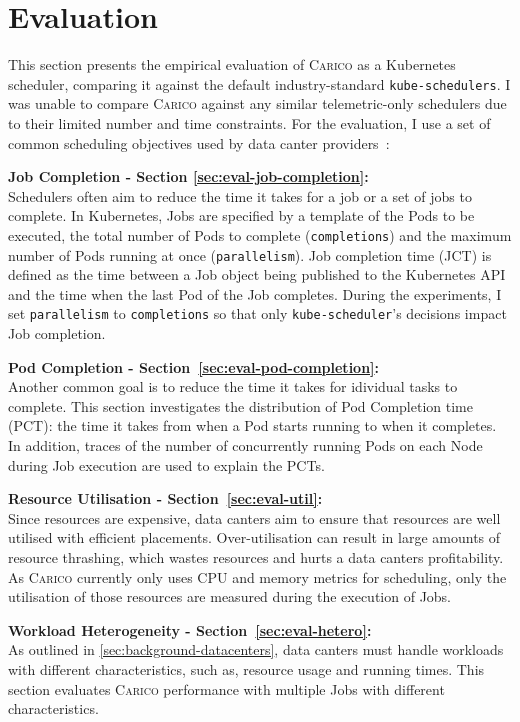 \chapter{Evaluation}

This section presents the empirical evaluation of \textsc{Carico} as a
Kubernetes scheduler, comparing it against the default industry-standard
\texttt{kube-schedulers}. I was unable to compare \textsc{Carico} against any
similar telemetric-only schedulers due to their limited number and time
constraints. For the evaluation, I use a set of common scheduling objectives
used by data canter providers~\cite{vijayakumar2024scheduling}:

\textbf{Job Completion - Section \ref{sec:eval-job-completion}:}\\
Schedulers often aim to reduce the time it takes for a job or a set of jobs to
complete. In Kubernetes, Jobs are specified by a template of the Pods to be
executed, the total number of Pods to complete (\texttt{completions}) and the
maximum number of Pods running at once (\texttt{parallelism}). Job completion
time (JCT) is defined as the time between a Job object being published to the
Kubernetes API and the time when the last Pod of the Job completes. During the
experiments, I set \texttt{parallelism} to \texttt{completions} so that only
\texttt{kube-scheduler}'s decisions impact Job completion.

\textbf{Pod Completion - Section~\ref{sec:eval-pod-completion}:}\\
Another common goal is to reduce the time it takes for idividual tasks to complete.
This section investigates the distribution of Pod Completion time (PCT): the
time it takes from when a Pod starts running to when it completes. In addition,
traces of the number of concurrently running Pods on each Node during Job
execution are used to explain the PCTs.

\textbf{Resource Utilisation - Section~\ref{sec:eval-util}:}\\
Since resources are expensive, data canters aim to ensure that resources are
well utilised with efficient placements. Over-utilisation can result in large
amounts of resource thrashing, which wastes resources and hurts a data canters
profitability. As \textsc{Carico} currently only uses CPU and memory metrics
for scheduling, only the utilisation of those resources are measured during the
execution of Jobs.

\textbf{Workload Heterogeneity - Section~\ref{sec:eval-hetero}:}\\
As outlined in \ref{sec:background-datacenters}, data canters must handle
workloads with different characteristics, such as, resource usage and running
times. This section evaluates \textsc{Carico} performance with multiple Jobs
with different characteristics.

